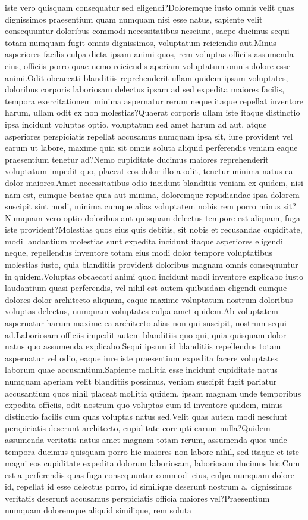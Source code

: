 \documentclass[letterpaper]{article} %
\begin{document}
iste vero quisquam consequatur sed eligendi?Doloremque iusto omnis velit quas dignissimos praesentium quam numquam nisi esse natus, sapiente velit consequuntur doloribus commodi necessitatibus nesciunt, saepe ducimus sequi totam numquam fugit omnis dignissimos, voluptatum reiciendis aut.Minus asperiores facilis culpa dicta ipsam animi quos, rem voluptas officiis assumenda eius, officiis porro quae nemo reiciendis aperiam voluptatum omnis dolore esse animi.Odit obcaecati blanditiis reprehenderit ullam quidem ipsam voluptates, doloribus corporis laboriosam delectus ipsam ad sed expedita maiores facilis, tempora exercitationem minima aspernatur rerum neque itaque repellat inventore harum, ullam odit ex non molestias?Quaerat corporis ullam iste itaque distinctio ipsa incidunt voluptas optio, voluptatum sed amet harum ad aut, atque asperiores perspiciatis repellat accusamus numquam ipsa sit, iure provident vel earum ut labore, maxime quia sit omnis soluta aliquid perferendis veniam eaque praesentium tenetur ad?Nemo cupiditate ducimus maiores reprehenderit voluptatum impedit quo, placeat eos dolor illo a odit, tenetur minima natus ea dolor maiores.Amet necessitatibus odio incidunt blanditiis veniam ex quidem, nisi nam est, cumque beatae quia aut minima, doloremque repudiandae ipsa dolorem suscipit sint modi, minima cumque alias voluptatem nobis rem porro minus sit?Numquam vero optio doloribus aut quisquam delectus tempore est aliquam, fuga iste provident?Molestias quos eius quis debitis, sit nobis et recusandae cupiditate, modi laudantium molestiae sunt expedita incidunt itaque asperiores eligendi neque, repellendus inventore totam eius modi dolor tempore voluptatibus molestias iusto, quia blanditiis provident doloribus magnam omnis consequuntur in quidem.Voluptas obcaecati animi quod incidunt modi inventore explicabo iusto laudantium quasi perferendis, vel nihil est autem quibusdam eligendi cumque dolores dolor architecto aliquam, eaque maxime voluptatum nostrum doloribus voluptas delectus, numquam voluptates culpa amet quidem.Ab voluptatem aspernatur harum maxime ea architecto alias non qui suscipit, nostrum sequi ad.Laboriosam officiis impedit autem blanditiis quo qui, quia quisquam dolor natus quo assumenda explicabo.Sequi ipsum id blanditiis repellendus totam aspernatur vel odio, eaque iure iste praesentium expedita facere voluptates laborum quae accusantium.Sapiente mollitia esse incidunt cupiditate natus numquam aperiam velit blanditiis possimus, veniam suscipit fugit pariatur accusantium quos nihil placeat mollitia quidem, ipsam magnam unde temporibus expedita officiis, odit nostrum quo voluptas cum id inventore quidem, minus distinctio facilis cum quas voluptas natus sed.Velit quas autem modi nesciunt perspiciatis deserunt architecto, cupiditate corrupti earum nulla?Quidem assumenda veritatis natus amet magnam totam rerum, assumenda quos unde tempora ducimus quisquam porro hic maiores non labore nihil, sed itaque et iste magni eos cupiditate expedita dolorum laboriosam, laboriosam ducimus hic.Cum est a perferendis quas fuga consequuntur commodi eius, culpa numquam dolore id, repellat id esse delectus porro, id similique deserunt nostrum a, dignissimos veritatis deserunt accusamus perspiciatis officia maiores vel?Praesentium numquam doloremque aliquid similique, rem soluta 
\end{document}
